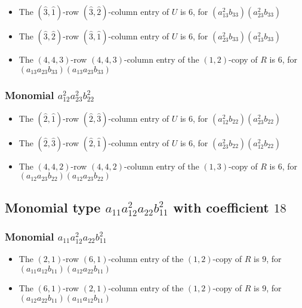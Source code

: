 \documentclass{article}
\begin{document}
\begin{itemize}
\item The $(\hat{3}, \hat{1})$-row $(\hat{3}, \hat{2})$-column entry of $U$ is $6$, for $( a_{13}^{2} b_{33} )( a_{23}^{2} b_{33} )$ 
\item The $(\hat{3}, \hat{2})$-row $(\hat{3}, \hat{1})$-column entry of $U$ is $6$, for $( a_{23}^{2} b_{33} )( a_{13}^{2} b_{33} )$ 
\item The $(4, 4, 3)$-row $(4, 4, 3)$-column entry of the $ \left(1, 2\right) $-copy of $R$ is $ 6 $, for $( a_{13} a_{23} b_{33} )( a_{13} a_{23} b_{33} )$ 
\end{itemize}
\subsubsection{Monomial $ a_{12}^{2} a_{23}^{2} b_{22}^{2} $}

\begin{itemize}
\item The $(\hat{2}, \hat{1})$-row $(\hat{2}, \hat{3})$-column entry of $U$ is $6$, for $( a_{12}^{2} b_{22} )( a_{23}^{2} b_{22} )$ 
\item The $(\hat{2}, \hat{3})$-row $(\hat{2}, \hat{1})$-column entry of $U$ is $6$, for $( a_{23}^{2} b_{22} )( a_{12}^{2} b_{22} )$ 
\item The $(4, 4, 2)$-row $(4, 4, 2)$-column entry of the $ \left(1, 3\right) $-copy of $R$ is $ 6 $, for $( a_{12} a_{23} b_{22} )( a_{12} a_{23} b_{22} )$ 
\end{itemize}
\subsection{Monomial type $ a_{11} a_{12}^{2} a_{22} b_{11}^{2} $ with coefficient $ 18 $}

\subsubsection{Monomial $ a_{11} a_{12}^{2} a_{22} b_{11}^{2} $}

\begin{itemize}
\item The $(2, 1)$-row $(6, 1)$-column entry of the $ \left(1, 2\right) $-copy of $R$ is $ 9 $, for $( a_{11} a_{12} b_{11} )( a_{12} a_{22} b_{11} )$ 
\item The $(6, 1)$-row $(2, 1)$-column entry of the $ \left(1, 2\right) $-copy of $R$ is $ 9 $, for $( a_{12} a_{22} b_{11} )( a_{11} a_{12} b_{11} )$ 
\end{itemize}
\end{document}
